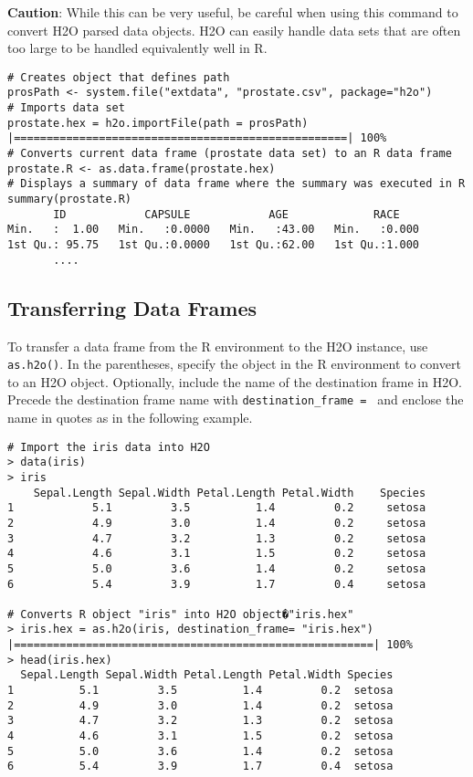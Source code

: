 {{{\textbf{Caution}}: While this can be very useful, be careful when using this command to convert H2O parsed data objects. H2O can easily handle data sets that are often too large to be handled equivalently well in R. 
\small
\begin{lstlisting}[style=R]
# Creates object that defines path
prosPath <- system.file("extdata", "prostate.csv", package="h2o")
# Imports data set
prostate.hex = h2o.importFile(path = prosPath)
|===================================================| 100%
# Converts current data frame (prostate data set) to an R data frame
prostate.R <- as.data.frame(prostate.hex)
# Displays a summary of data frame where the summary was executed in R
summary(prostate.R) 
       ID            CAPSULE            AGE             RACE
Min.   :  1.00   Min.   :0.0000   Min.   :43.00   Min.   :0.000
1st Qu.: 95.75   1st Qu.:0.0000   1st Qu.:62.00   1st Qu.:1.000
       .... 
\end{lstlisting}
\newpage

\subsection{Transferring Data Frames}
To transfer a data frame from the R environment to the H2O instance, use  {\texttt{as.h2o()}}. In the parentheses, specify the object in the R environment to convert to an H2O object. Optionally, include the name of the destination frame in H2O. Precede the destination frame name with {\texttt{destination\_frame = }} and enclose the name in quotes as in the following example.

\small
\begin{lstlisting}[style=R]
# Import the iris data into H2O
> data(iris)
> iris
    Sepal.Length Sepal.Width Petal.Length Petal.Width    Species
1            5.1         3.5          1.4         0.2     setosa
2            4.9         3.0          1.4         0.2     setosa
3            4.7         3.2          1.3         0.2     setosa
4            4.6         3.1          1.5         0.2     setosa
5            5.0         3.6          1.4         0.2     setosa
6            5.4         3.9          1.7         0.4     setosa

# Converts R object "iris" into H2O object�"iris.hex"
> iris.hex = as.h2o(iris, destination_frame= "iris.hex")
|=======================================================| 100%
> head(iris.hex)
  Sepal.Length Sepal.Width Petal.Length Petal.Width Species
1          5.1         3.5          1.4         0.2  setosa
2          4.9         3.0          1.4         0.2  setosa
3          4.7         3.2          1.3         0.2  setosa
4          4.6         3.1          1.5         0.2  setosa
5          5.0         3.6          1.4         0.2  setosa
6          5.4         3.9          1.7         0.4  setosa
\end{lstlisting}
\normalsize

}}
